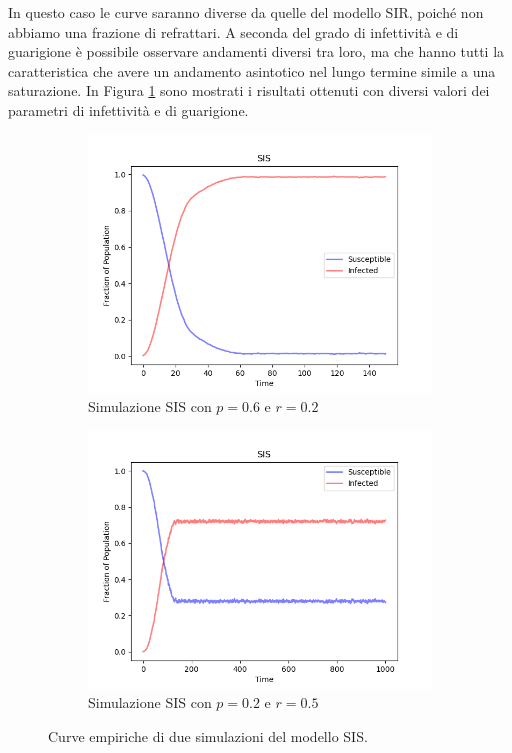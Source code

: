 \documentclass{article}
\begin{document}
    In questo caso le curve saranno diverse da quelle del modello SIR, poiché non abbiamo una frazione di refrattari.
    A seconda del grado di infettività e di guarigione è possibile osservare andamenti diversi tra loro, ma che hanno
    tutti la caratteristica che avere un andamento asintotico nel lungo termine simile a una saturazione. In Figura
    \ref{fig:sis_curves} sono mostrati i risultati ottenuti con diversi valori dei parametri di infettività e di guarigione.
    \begin{figure}[H]
        \centering
        \begin{subfigure}[b]{0.49\linewidth}
         \centering
         \includegraphics[width=\linewidth]{../images/SIS_curves}
            \caption{Simulazione SIS con $p=0.6$ e $r=0.2$}
     \end{subfigure}
        \hfill
        \begin{subfigure}[b]{0.49\linewidth}
         \centering
         \includegraphics[width=\linewidth]{../images/SIS_curves1}
            \caption{Simulazione SIS con $p=0.2$ e $r=0.5$}
     \end{subfigure}
     \caption{Curve empiriche di due simulazioni del modello SIS.}
     \label{fig:sis_curves}
    \end{figure}
\end{document}

